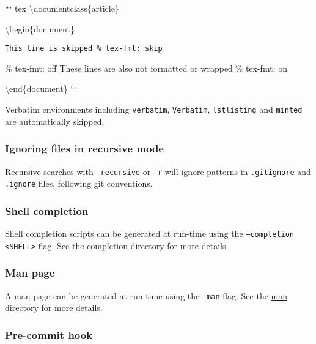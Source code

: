 \documentclass{scrartcl}
\begin{document}
``` tex
\textbackslash{}documentclass\{article\}

\textbackslash{}begin\{document\}

\begin{verbatim}This line is skipped % tex-fmt: skip
\end{verbatim}

\% tex-fmt: off
  These lines are also
    not formatted or wrapped
\% tex-fmt: on

\textbackslash{}end\{document\}
```

Verbatim environments including \texttt{verbatim}, \texttt{Verbatim}, \texttt{lstlisting}
and \texttt{minted} are automatically skipped.

\subsubsection{Ignoring files in recursive mode}\hypertarget{ignoring-files-in-recursive-mode}{}\label{ignoring-files-in-recursive-mode}

Recursive searches with \texttt{--recursive} or \texttt{-r} will
ignore patterns in \texttt{.gitignore} and \texttt{.ignore} files,
following git conventions.

\subsubsection{Shell completion}\hypertarget{shell-completion}{}\label{shell-completion}

Shell completion scripts can be generated at run-time using the
\texttt{--completion \textless{}SHELL\textgreater{}} flag. See the
\href{https://github.com/WGUNDERWOOD/tex-fmt/tree/main/completion}{completion}
directory for more details.

\subsubsection{Man page}\hypertarget{man-page}{}\label{man-page}

A man page can be generated at run-time using the
\texttt{--man} flag. See the
\href{https://github.com/WGUNDERWOOD/tex-fmt/tree/main/man}{man}
directory for more details.

\subsubsection{Pre-commit hook}\hypertarget{pre-commit-hook}{}\label{pre-commit-hook}
\end{document}
